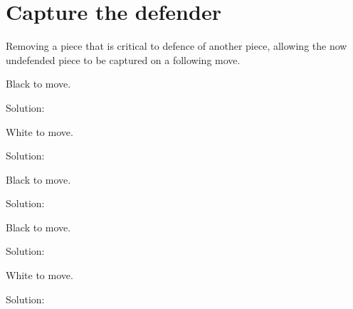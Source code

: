 \documentclass{book}
\begin{document}
\section{Capture the defender}
Removing a piece that is critical to defence of another piece, allowing the now undefended piece to be captured on a following move.\begin{multicols}{2} 
\begin{samepage} 
\newgame 


 
\showboard
 
 Black to move. 
 
Solution: 
 
\end{samepage}\begin{samepage} 
\newgame 


 
\showboard
 
 White to move. 
 
Solution: 
 
\end{samepage}\begin{samepage} 
\newgame 


 
\showboard
 
 Black to move. 
 
Solution: 
 
\end{samepage}\begin{samepage} 
\newgame 


 
\showboard
 
 Black to move. 
 
Solution: 
 
\end{samepage}\begin{samepage} 
\newgame 


 
\showboard
 
 White to move. 
 
Solution: 
 
\end{samepage}\end{multicols} 
\newpage 
\end{document}

